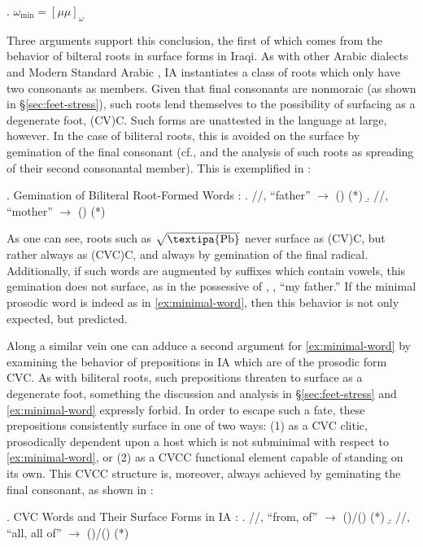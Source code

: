\documentclass[12pt,twoside,letterpaper]{article}
\begin{document}
\ex. \label{ex:minimal-word}$\omega_{\textrm{min}} = [\mu\mu]_{\omega}$

Three arguments support this conclusion, the first of which comes from the behavior of bilteral roots in surface forms in Iraqi. As with other Arabic dialects and Modern Standard Arabic \citep{ryding05}, IA instantiates a class of roots which only have two consonants as members. Given that final consonants are nonmoraic (as shown in \S{\ref{sec:feet-stress}}), such roots lend themselves to the possibility of surfacing as a degenerate foot, (CV)C. Such forms are unattested in the language at large, however. In the case of biliteral roots, this is avoided on the surface by gemination of the final consonant (cf., \cite{mccarthy79} and the analysis of such roots as spreading of their second consonantal member). This is exemplified in \Next:

\ex. \label{ex:biliteral-gemination} Gemination of Biliteral Root-Formed Words \citep[p.174]{erwin04}:
\a. //, ``father'' $\rightarrow$ () (*)
\b. //, ``mother'' $\rightarrow$ () (*)

As one can see, roots such as $\sqrt{\textrm{\textipa{Pb}}}$ never surface as (CV)C, but rather always as (CVC)C, and always by gemination of the final radical. Additionally, if such words are augmented by suffixes which contain vowels, this gemination does not surface, as in the possessive of \Last[a], {\em {}}, ``my father.'' If the minimal prosodic word is indeed as in \ref{ex:minimal-word}, then this behavior is not only expected, but predicted.

Along a similar vein one can adduce a second argument for \ref{ex:minimal-word} by examining the behavior of prepositions in IA which are of the prosodic form CVC. As with biliteral roots, such prepositions threaten to surface as a degenerate foot, something the discussion and analysis in \S{\ref{sec:feet-stress}} and \ref{ex:minimal-word} expressly forbid. In order to escape such a fate, these prepositions consistently surface in one of two ways: (1) as a CVC clitic, prosodically dependent upon a host which is not subminimal with respect to \ref{ex:minimal-word}, or (2) as a CVCC functional element capable of standing on its own. This CVCC structure is, moreover, always achieved by geminating the final consonant, as shown in \Next:

\ex. \label{ex:CVC-prep-contrast} CVC Words and Their Surface Forms in IA \citep[p.281]{erwin04}:
\a. //, ``from, of'' $\rightarrow$ ()/() (*)
\b. //, ``all, all of'' $\rightarrow$ ()/() (*)
\end{document}
